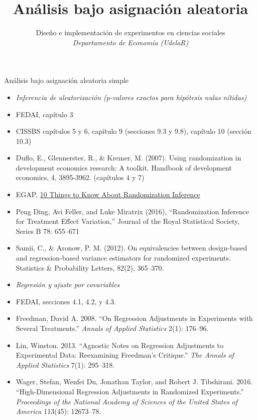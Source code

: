 \documentclass[
  ignorenonframetext,
]{beamer}
\title{Análisis bajo asignación aleatoria}
\author{Diseño e implementación de experimentos en ciencias sociales\\
\emph{Departamento de Economía (UdelaR)}}
\date{}
\providecommand{\tightlist}{%
  \setlength{\itemsep}{0pt}\setlength{\parskip}{0pt}}
\begin{document}
\frame{\titlepage}

\begin{frame}{Análisis bajo asignación aleatoria simple}
\protect\hypertarget{anuxe1lisis-bajo-asignaciuxf3n-aleatoria-simple}{}
\begin{itemize}
\tightlist
\item
  \emph{Inferencia de aleatorización (p-valores exactos para hipótesis
  nulas nítidas)}
\end{itemize}

\tiny

\begin{itemize}
\tightlist
\item
  FEDAI, capítulo 3
\item
  CISSBS capítulos 5 y 6, capítulo 9 (secciones 9.3 y 9.8), capítulo 10
  (sección 10.3)
\item
  Duflo, E., Glennerster, R., \& Kremer, M. (2007). Using randomization
  in development economics research: A toolkit. Handbook of development
  economics, 4, 3895-3962. (capítulos 4 y 7)
\item
  EGAP,
  \href{https://egap.org/resource/10-things-to-know-about-hypothesis-testing/}{10
  Things to Know About Randomization Inference}
\item
  Peng Ding, Avi Feller, and Luke Miratrix (2016), ``Randomization
  Inference for Treatment Effect Variation,'' Journal of the Royal
  Statistical Society, Series B 78: 655--671
\item
  Samii, C., \& Aronow, P. M. (2012). On equivalencies between
  design-based and regression-based variance estimators for randomized
  experiments. Statistics \& Probability Letters, 82(2), 365--370.
\end{itemize}

\normalsize

\begin{itemize}
\tightlist
\item
  \emph{Regresión y ajuste por covariables}
\end{itemize}

\tiny

\begin{itemize}
\tightlist
\item
  FEDAI, secciones 4.1, 4.2, y 4.3.
\item
  Freedman, David A. 2008. ``On Regression Adjustments in Experiments
  with Several Treatments.'' \emph{Annals of Applied Statistics} 2(1):
  176--96.
\item
  Lin, Winston. 2013. ``Agnostic Notes on Regression Adjustments to
  Experimental Data: Reexamining Freedman's Critique.'' \emph{The Annals
  of Applied Statistics} 7(1): 295--318.
\item
  Wager, Stefan, Wenfei Du, Jonathan Taylor, and Robert J. Tibshirani.
  2016. ``High-Dimensional Regression Adjustments in Randomized
  Experiments.'' \emph{Proceedings of the National Academy of Sciences
  of the United States of America} 113(45): 12673--78.
\end{itemize}
\end{frame}
\end{document}
